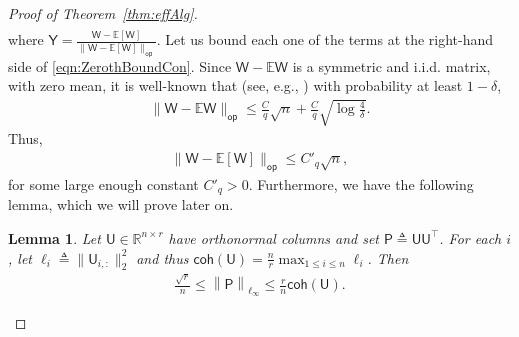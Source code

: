 \documentclass[12pt]{article}
\newcommand{\bE}{\mathbb{E}}
\newtheorem{lemma}{Lemma}
\newcommand{\norm}[1]{\left\|#1\right\|}
\newcommand{\s}[1]{\mathsf{#1}}
\begin{document}
\begin{proof}[Proof of Theorem~\ref{thm:effAlg}]
\begin{align}
    \label{eqn:ZerothBoundCon}
\end{align}
where $\s{Y}=\frac{\s{W}-\bE[\s{W}]}{\|\s{W}-\bE[\s{W}]\|_{\s{op}}}$. Let us bound each one of the terms at the right-hand side of \eqref{eqn:ZerothBoundCon}. Since $\s{W}-\bE\s{W}$ is a symmetric and i.i.d. matrix, with zero mean, it is well-known that (see, e.g., \cite[Corollary 4.4.7]{vershynin2010introduction}) with probability at least $1-\delta$,
\begin{align}
    \|\s{W}-\bE\s{W}\|_{\s{op}}\leq \frac{C}{q}\sqrt{n}+\frac{C}{q}\sqrt{\log\frac{4}{\delta}}.\label{eqn:FirstBoundCon00}
\end{align}
Thus,
\begin{align}
    \|\s{W}-\bE[\s{W}]\|_{\s{op}}\leq C'_q\sqrt{n},\label{eqn:FirstBoundCon}
\end{align}
for some large enough constant $C'_q>0$. Furthermore, we have the following lemma, which we will prove later on.

\begin{lemma}\label{lem:maxNormCohe}
Let $\s{U}\in\mathbb{R}^{n\times r}$ have orthonormal columns and set $\s{P}\triangleq \s{U}\s{U}^{\top}$.  
For each $i$, let $\ell_i\triangleq\|\s{U}_{i,:}\|_2^2$ and thus $\s{coh}(\s{U})=\frac{n}{r}\max_{1\leq i\leq n}\ell_i$. Then
\begin{align}
\frac{\sqrt{r}}{n}\leq\norm{\s{P}}_{\ell_\infty}\leq\frac{r}{n}\s{coh}(\s{U}).
\end{align}
\end{lemma}


\end{proof}
\end{document}
